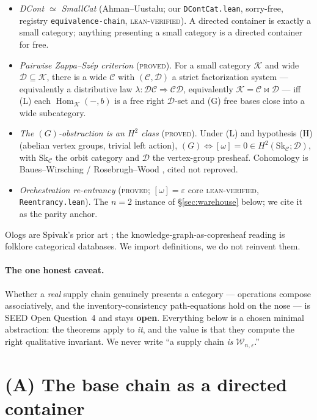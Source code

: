 \documentclass[11pt]{article}
\theoremstyle{definition}
\newcommand{\Hom}{\operatorname{Hom}}
\newcommand{\C}{\mathcal{C}}
\newcommand{\D}{\mathcal{D}}
\newcommand{\W}{\mathcal{W}}
\newcommand{\K}{\mathcal{K}}
\newcommand{\Sk}{\mathrm{Sk}}
\begin{document}
\begin{itemize}
\item[\textbf{(T1)}] \emph{DCont $\simeq$ SmallCat} (Ahman--Uustalu; our
\texttt{DContCat.lean}, sorry-free, registry \texttt{equivalence-chain},
\textsc{lean-verified}). A directed container is exactly a small category; anything
presenting a small category is a directed container for free.
\item[\textbf{(T2)}] \emph{Pairwise Zappa--Sz\'ep criterion} \cite{pairwise}
(\textsc{proved}). For a small category $\K$ and wide $\D\subseteq\K$, there is a wide
$\C$ with $(\C,\D)$ a strict factorization system --- equivalently a distributive law
$\lambda:\D\C\Rightarrow\C\D$, equivalently $\K=\C\bowtie\D$ --- iff \textnormal{(L)}
each $\Hom_\K(-,b)$ is a free right $\D$-set and \textnormal{(G)} free bases close into
a wide subcategory.
\item[\textbf{(T3)}] \emph{The $(G)$-obstruction is an $H^2$ class} \cite{gobstr}
(\textsc{proved}). Under \textnormal{(L)} and hypothesis \textnormal{(H)} (abelian
vertex groups, trivial left action), $(G)\Leftrightarrow[\omega]=0\in
H^2(\Sk_\C;\D)$, with $\Sk_\C$ the orbit category and $\D$ the vertex-group presheaf.
Cohomology is Baues--Wirsching \cite{bw} / Rosebrugh--Wood \cite{rw}, cited not
reproved.
\item[\textbf{(T4)}] \emph{Orchestration re-entrancy} \cite{orch} (\textsc{proved};
$[\omega]=\varepsilon$ core \textsc{lean-verified}, \texttt{Reentrancy.lean}). The
$n=2$ instance of \S\ref{sec:warehouse} below; we cite it as the parity anchor.
\end{itemize}

Ologs are Spivak's prior art \cite{spivak}; the knowledge-graph-as-copresheaf reading
is folklore categorical databases. We import definitions, we do not reinvent them.

\paragraph{The one honest caveat.} Whether a \emph{real} supply chain genuinely
presents a category --- operations compose associatively, and the
inventory-consistency path-equations hold on the nose --- is SEED Open Question~4 and
stays \textbf{open}. Everything below is a chosen minimal abstraction: the theorems
apply to \emph{it}, and the value is that they compute the right qualitative
invariant. We never write ``a supply chain \emph{is} $\W_{n,\varepsilon}$.''

\section{(A) The base chain as a directed container}\label{sec:base}
\end{document}
